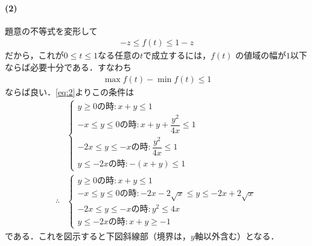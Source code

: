 \documentclass[../../main.tex]{subfiles}
\begin{document}
\paragraph{(2)}

題意の不等式を変形して
\begin{align}
  -z \le f(t) \le 1-z
\end{align}
だから，これが$0 \le t \le 1$なる任意の$t$で成立するには，$f(t)$ の値域の幅が$1$以下ならば必要十分である．すなわち
\begin{align}
  \max f(t) - \min f(t) \le 1 \label{eq:3}
\end{align}
ならば良い．\cref{eq:2}よりこの条件は
\begin{align}
  &
  \begin{cases}
    y \ge 0 \text{の時}: x+y \le 1 \\
    -x \le y \le 0 \text{の時}: x+y + \dfrac{y^2}{4x} \le 1 \\
    -2x \le y \le -x \text{の時}: \dfrac{y^2}{4x} \le 1 \\
    y \le -2x \text{の時}: -(x+y) \le 1
  \end{cases} \\
  \therefore
  &
  \begin{cases}
    y \ge 0 \text{の時}: x+y \le 1 \\
    -x \le y \le 0 \text{の時}: -2x-2\sqrt{x} \le y \le -2x+2\sqrt{x} \\
    -2x \le y \le -x \text{の時}: y^2 \le 4x \\
    y \le -2x \text{の時}: x+y \ge -1
  \end{cases}
\end{align}
である．これを図示すると下図斜線部（境界は，$y$軸以外含む）となる．
\end{document}
